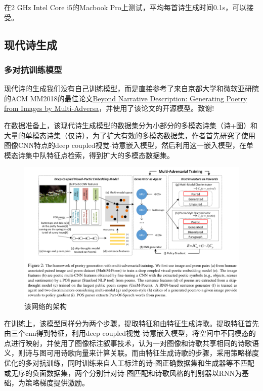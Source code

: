 \documentclass[a4paper, 10pt]{article}
\begin{document}
在2 GHz Intel Core i5的Macbook Pro上测试，平均每首诗生成时间0.1s，可以接受。

\subsection{现代诗生成}
\subsubsection*{多对抗训练模型}
现代诗的生成我们没有自己训练模型，而是直接参考了来自京都大学和微软亚研院的ACM MM2018的最佳论文\href{https://arxiv.org/pdf/1804.08473.pdf}{Beyond Narrative Description: Generating Poetry from Images by Multi-Adversa}，并使用了该论文的开源模型。致谢!

在数据准备上，该现代诗生成模型的数据集分为小部分的多模态诗集（诗+图）和大量的单模态诗集（仅诗），为了扩大有效的多模态数据集，作者首先研究了使用图像CNN特点的deep coupled视觉-诗意嵌入模型，然后利用这一嵌入模型，在单模态诗集中队特征点检索，得到扩大的多模态数据集。
\begin{figure}[H]
\centering
\includegraphics[width=0.9\linewidth]{imgs/8.png}
\caption{该网络的架构}
\end{figure}

在训练上，该模型同样分为两个步骤，提取特征和由特征生成诗歌。提取特征首先由三个cnn得到特征，利用deep coupled视觉-诗意嵌入模型，将空间中不同模态的点进行映射，并使用了图像标注叙事技术，认为一对图像和诗歌共享相同的诗歌语义，则诗与图可用诗歌向量来计算关联。而由特征生成诗歌的步骤，采用策略梯度优化的多对抗训练，同时训练来自人工标注的诗-图正确数据集和生成器等不匹配或无序的负面数据集，两个分别针对诗-图匹配和诗歌风格的判别器以RNN为基础，为策略梯度提供激励。
\end{document}
